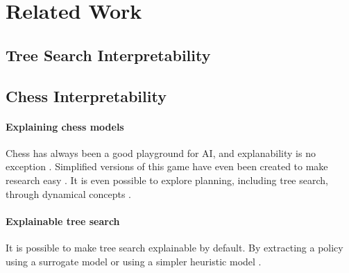 \section{Related Work}

\subsection{Tree Search Interpretability}

\subsection{Chess Interpretability}

\paragraph{Explaining chess models}
Chess has always been a good playground for AI, and explanability is no exception \cite{McGrath2022Acquisition}. Simplified versions of this game have even been created to make research easy \cite{hammersborg2023reinforcement,hammersborg2023information}.
It is even possible to explore planning, including tree search, through dynamical concepts \cite{schut2023bridging}.

\paragraph{Explainable tree search}
It is possible to make tree search explainable by default. By extracting a policy using a surrogate model \cite{Soemers2022ExtractingTL} or using a simpler heuristic model \cite{Soemers2019BiasingMW}.
